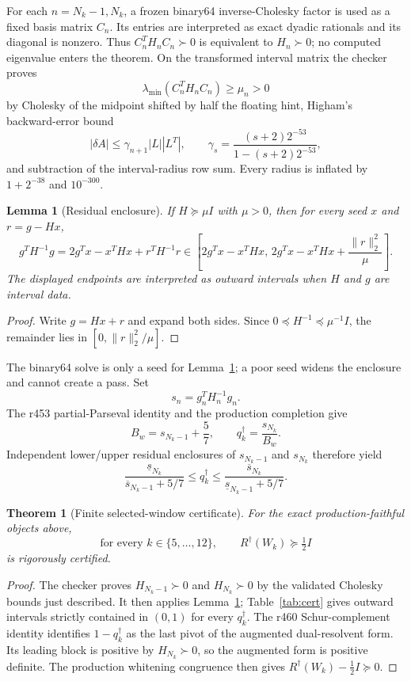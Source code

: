 \documentclass[11pt]{article}
\newtheorem{theorem}{Theorem}
\newtheorem{lemma}{Lemma}
\theoremstyle{remark}
\newcommand{\Rd}{R^{\dagger}}
\newcommand{\qdag}{q^{\dagger}}
\begin{document}
For each $n=N_k-1,N_k$, a frozen binary64 inverse-Cholesky factor is
used as a fixed basis matrix $C_n$.  Its entries are interpreted as
exact dyadic rationals and its diagonal is nonzero.  Thus
$C_n^TH_nC_n\succ0$ is equivalent to $H_n\succ0$; no computed
eigenvalue enters the theorem.  On the transformed interval matrix
the checker proves
\[
 \lambda_{\min}(C_n^TH_nC_n)\ge\mu_n>0
\]
by Cholesky of the midpoint shifted by half the floating hint,
Higham's backward-error bound
\[
 |\delta A|\le\gamma_{n+1}|L||L^T|,
\qquad
\gamma_s=\frac{(s+2)2^{-53}}{1-(s+2)2^{-53}},
\]
and subtraction of the interval-radius row sum.  Every radius is
inflated by $1+2^{-38}$ and $10^{-300}$.

\begin{lemma}[Residual enclosure]\label{lem:residual}
If $H\succeq\mu I$ with $\mu>0$, then for every seed $x$ and
$r=g-Hx$,
\[
 g^TH^{-1}g
 =2g^Tx-x^THx+r^TH^{-1}r
\in
\left[
 2g^Tx-x^THx,\,
 2g^Tx-x^THx+\frac{\|r\|_2^2}{\mu}
\right].
\]
The displayed endpoints are interpreted as outward intervals when
$H$ and $g$ are interval data.
\end{lemma}

\begin{proof}
Write $g=Hx+r$ and expand both sides.  Since
$0\preceq H^{-1}\preceq\mu^{-1}I$, the remainder lies in
$[0,\|r\|_2^2/\mu]$.
\end{proof}

The binary64 solve is only a seed for Lemma~\ref{lem:residual}; a poor
seed widens the enclosure and cannot create a pass.  Set
\[
 s_n=g_n^TH_n^{-1}g_n .
\]
The r453 partial-Parseval identity and the production completion give
\[
 B_w=s_{N_k-1}+\frac57,\qquad
 \qdag_k=\frac{s_{N_k}}{B_w}.
\]
Independent lower/upper residual enclosures of $s_{N_k-1}$ and
$s_{N_k}$ therefore yield
\[
 \frac{\underline s_{N_k}}
      {\overline s_{N_k-1}+5/7}
\le\qdag_k\le
 \frac{\overline s_{N_k}}
      {\underline s_{N_k-1}+5/7}.
\]

\begin{theorem}[Finite selected-window certificate]\label{thm:cert}
For the exact production-faithful objects above,
\[
 \boxed{\quad
 \text{for every }k\in\{5,\ldots,12\},\qquad
 \Rd(W_k)\succeq\tfrac12 I
 \quad}
\]
is rigorously certified.
\end{theorem}

\begin{proof}
The checker proves $H_{N_k-1}\succ0$ and $H_{N_k}\succ0$ by the
validated Cholesky bounds just described.  It then applies
Lemma~\ref{lem:residual}; Table~\ref{tab:cert} gives outward intervals
strictly contained in $(0,1)$ for every $\qdag_k$.
The r460 Schur-complement identity identifies $1-\qdag_k$ as the last
pivot of the augmented dual-resolvent form.  Its leading block is
positive by $H_{N_k}\succ0$, so the augmented form is positive
definite.  The production whitening congruence then gives
$\Rd(W_k)-\tfrac12I\succeq0$.
\end{proof}
\end{document}
